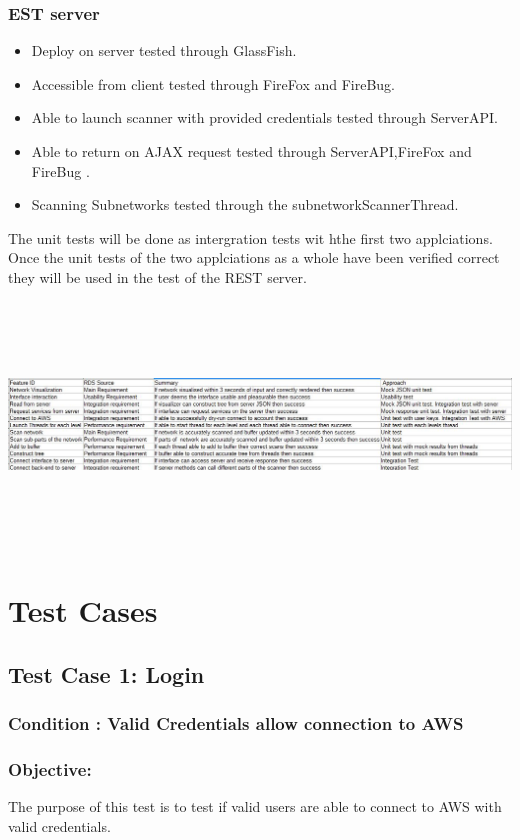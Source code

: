 \documentclass[hidelinks,a4paper,12pt]{article}
\begin{document}
\subsubsection{EST server}
\begin{itemize}
  \item Deploy on server tested through GlassFish.
  \item Accessible from client tested through FireFox and FireBug.
  \item Able to launch scanner with provided credentials tested through ServerAPI.
  \item Able to return on AJAX request tested through ServerAPI,FireFox and FireBug .
   \item Scanning Subnetworks  tested through the subnetworkScannerThread.
\end{itemize}
The unit tests will be done as intergration tests wit hthe first two applciations. Once the unit tests of the two applciations as a whole have been verified correct they will be used in the test of the REST server.

\includegraphics[width=17.3cm,height=6.5cm]{./images/table.jpg}
\newpage
 \section{Test Cases}
\subsection{Test Case 1: Login}
\subsubsection{Condition : Valid Credentials allow connection to AWS}
\subsubsection{Objective:} The purpose of this test is to test if valid users are able to connect to AWS with valid credentials.
\end{document}

